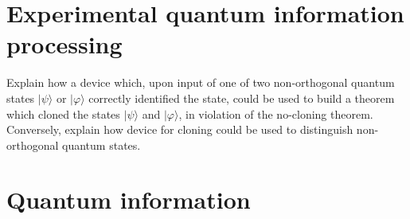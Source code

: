 \documentclass[en]{sol-man}
\begin{document}
\section{Experimental quantum information processing}

\begin{exe}
    Explain how a device which, upon input of one of two non-orthogonal quantum states $\lvert\psi\rangle$ or $\lvert\varphi\rangle$ correctly identified the state, could be used to build a theorem which cloned the states $\lvert\psi\rangle$ and $\lvert\varphi\rangle$, in violation of the no-cloning theorem. Conversely, explain how device for cloning could be used to distinguish non-orthogonal quantum states.
\end{exe}
\begin{sol}
    
\end{sol}

\section{Quantum information}
\ifx\allfiles\undefined
\end{document}
